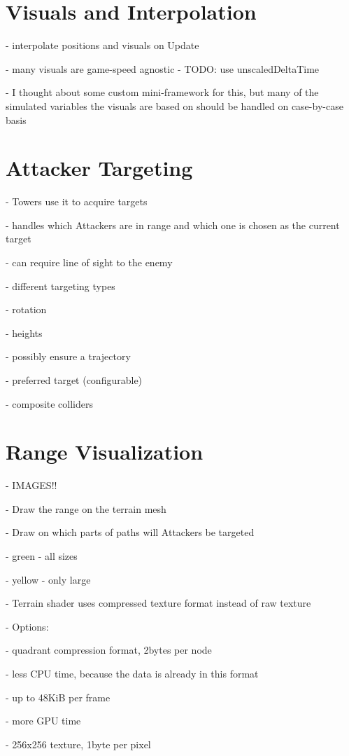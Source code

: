 \section{Visuals and Interpolation}

- interpolate positions and visuals on Update

- many visuals are game-speed agnostic     - TODO: use unscaledDeltaTime

- I thought about some custom mini-framework for this, but many of the simulated variables the visuals are based on should be handled on case-by-case basis

\section{Attacker Targeting}

- Towers use it to acquire targets

- handles which Attackers are in range and which one is chosen as the current target

- can require line of sight to the enemy

- different targeting types

- rotation

- heights

- possibly ensure a trajectory

- preferred target (configurable)

- composite colliders

\section{Range Visualization}

- IMAGES!!

- Draw the range on the terrain mesh

- Draw on which parts of paths will Attackers be targeted

- green - all sizes

- yellow - only large

- Terrain shader uses compressed texture format instead of raw texture

- Options:

- quadrant compression format, 2bytes per node

- less CPU time, because the data is already in this format

- up to 48KiB per frame

- more GPU time

- 256x256 texture, 1byte per pixel

